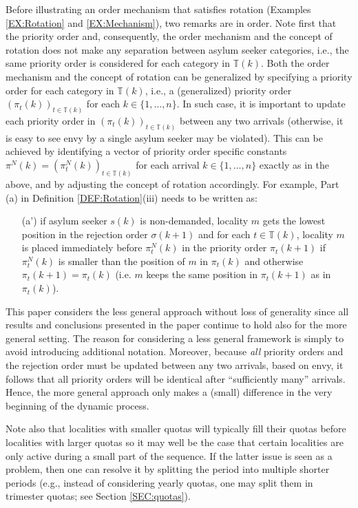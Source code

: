 \documentclass[12pt,fleqn]{article}
\begin{document}
\noindent Before illustrating an order mechanism that satisfies rotation (Examples \ref{EX:Rotation} and \ref{EX:Mechanism}), two remarks are in order. Note first that the priority order and, consequently, the order mechanism and the concept of rotation does not make any separation between asylum seeker categories, i.e., the same priority order is considered for each category in $\mathbb{T}(k)$. Both the order mechanism and the concept of rotation can be generalized by specifying a priority order for each category in $\mathbb{T}(k)$, i.e., a (generalized) priority order $(\pi_t(k))_{t\in \mathbb{T}(k)}$ for each $k\in\{1,\ldots,n\}$. In such case, it is important to update each priority order in $(\pi_t(k))_{t\in \mathbb{T}(k)}$ between any two arrivals (otherwise, it is easy to see envy by a single asylum seeker may be violated). This can be achieved by identifying a vector of priority order specific constants $\pi^N(k)=(\pi_t^N(k))_{t\in \mathbb{T}(k)}$ for each arrival $k\in\{1,\ldots,n\}$ exactly as in the above, and by adjusting the concept of rotation accordingly. For example, Part (a) in Definition \ref{DEF:Rotation}(iii) needs to be written as:
\begin{enumerate}
\item[(a')] 
if asylum seeker $s(k)$ is non-demanded, locality $m$ gets the lowest position in the rejection order $\sigma(k+1)$ and 
for each $t\in \mathbb{T}(k)$, locality $m$ is placed immediately before $\pi_t^{N}(k)$ in the priority order $\pi_t(k+1)$ if $\pi_t^N(k)$ is smaller than the position of $m$ in $\pi_t(k)$ and otherwise $\pi_t(k+1)=\pi_t(k)$ (i.e. $m$ keeps the same position in $\pi_t(k+1)$ as in $\pi_t(k)$).
\end{enumerate}
\noindent This paper considers the less general approach without loss of generality since all results and conclusions presented in the paper continue to hold also for the more general setting. The reason for considering a less general framework is simply to avoid introducing additional notation. Moreover, because \emph{all} priority orders and the rejection order must be updated between any two arrivals, based on envy, it follows that all priority orders will be identical after ``sufficiently many'' arrivals. Hence, the more general approach only makes a (small) difference in the very beginning of the dynamic process.

Note also that localities with smaller quotas will typically fill their quotas before localities with larger quotas so it may well be the case that certain localities are only active during a small part of the sequence. If the latter issue is seen as a problem, then one can resolve it by splitting the period into multiple shorter periods (e.g., instead of considering yearly quotas, one may split them in trimester quotas; see Section \ref{SEC:quotas}).
\end{document}
